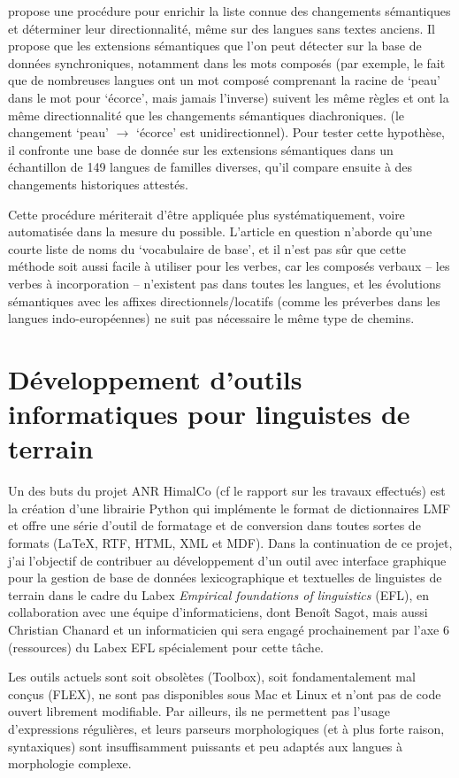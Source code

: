 \documentclass[oldfontcommands,oneside,a4paper,11pt]{article}
\begin{document}
\citet{urban11semantic} propose une procédure pour enrichir la liste connue des changements sémantiques et déterminer leur directionnalité, même sur des langues sans textes anciens. Il propose que les extensions sémantiques que l'on peut détecter sur la base de données synchroniques, notamment dans les mots composés (par exemple, le fait que de nombreuses langues ont un mot composé comprenant la racine de `peau' dans le mot pour `écorce', mais jamais l'inverse) suivent les même règles et ont la même directionnalité que les changements sémantiques diachroniques. (le changement `peau' $\rightarrow$ `écorce' est unidirectionnel). Pour tester cette hypothèse, il confronte une base de donnée sur les extensions sémantiques dans un échantillon de 149 langues de familles diverses, qu'il compare ensuite à des changements historiques attestés.

Cette procédure mériterait d'être appliquée plus systématiquement, voire automatisée dans la mesure du possible. L'article en question n'aborde qu'une courte liste de noms du `vocabulaire de base', et il n'est pas sûr que cette méthode soit aussi facile à utiliser pour les verbes, car les composés verbaux -- les verbes à incorporation -- n'existent pas dans toutes les langues, et les évolutions sémantiques avec les affixes directionnels/locatifs (comme les préverbes dans les langues indo-européennes) ne suit pas nécessaire le même type de chemins.

\section{Développement d'outils informatiques pour linguistes de terrain}
Un des buts du projet ANR HimalCo (cf le rapport sur les travaux effectués) est   la création d'une librairie Python qui implémente le format de dictionnaires LMF et offre une série d'outil de formatage et de conversion dans toutes sortes de formats (\LaTeX, RTF, HTML, XML et MDF). Dans la continuation de ce projet, j'ai l'objectif de contribuer au développement d'un outil avec interface graphique pour la gestion de base de données lexicographique et textuelles de linguistes de terrain dans le cadre du Labex \textit{Empirical foundations of linguistics} (EFL), en collaboration avec une équipe d'informaticiens, dont Benoît Sagot, mais aussi Christian Chanard et un informaticien qui sera engagé prochainement par l'axe 6 (ressources) du Labex EFL spécialement pour cette tâche. 

Les outils actuels sont soit obsolètes (Toolbox), soit fondamentalement mal conçus (FLEX), ne sont pas disponibles sous Mac et Linux et n'ont pas de code ouvert librement modifiable. Par ailleurs, ils ne permettent pas l'usage d'expressions régulières, et leurs parseurs morphologiques (et à plus forte raison, syntaxiques) sont insuffisamment puissants et peu adaptés aux langues à morphologie complexe. 
\end{document}
